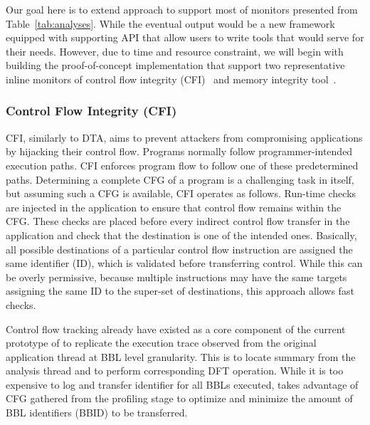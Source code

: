 Our goal here is to extend \sreplica approach to support most of monitors
presented from Table~\ref{tab:analyses}. While the eventual output would be a
new framework equipped with supporting API that allow users to write tools that
would serve for their needs. However, due to time and resource constraint, we
will begin with building the proof-of-concept implementation that support two
representative inline monitors of control flow integrity (CFI)~\cite{cfi} and
memory integrity tool~\cite{memcheck, drmemory:cgo2011}.

\subsubsection{Control Flow Integrity (CFI)} 

CFI, similarly to DTA, aims to prevent attackers from compromising applications
by hijacking their control flow. Programs normally follow programmer-intended
execution paths. CFI enforces program flow to follow one of these predetermined
paths. Determining a complete CFG of a program is a challenging task in itself,
but assuming such a CFG is available, CFI operates as follows.  Run-time checks
are injected in the application to ensure that control flow remains within the
CFG. These checks are placed before every indirect control flow transfer in the
application and check that the destination is one of the intended ones.
Basically, all possible destinations of a particular control flow instruction
are assigned the same identifier (ID), which is validated before transferring
control. While this can be overly permissive, because multiple instructions may
have the same targets assigning the same ID to the super-set of destinations,
this approach allows fast checks. 

Control flow tracking already have existed as a core component of the current
prototype of \sreplica to replicate the execution trace observed from
the original application thread at BBL level granularity. This is to locate
\tfa summary from the analysis thread and to perform corresponding DFT
operation.
%
While it is too expensive to log and transfer identifier for all BBLs executed,
\sreplica takes advantage of CFG gathered from the profiling stage to optimize
and minimize the amount of BBL identifiers (BBID) to be transferred.

